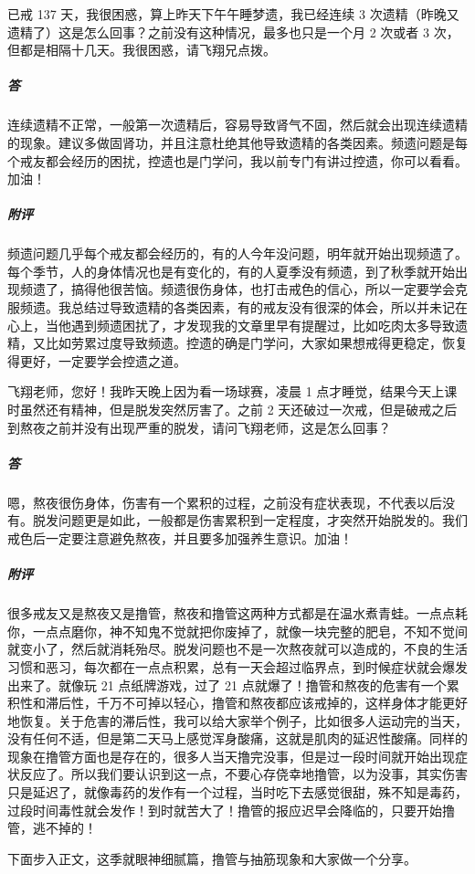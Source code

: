 \begin{case}
    已戒 137 天，我很困惑，算上昨天下午午睡梦遗，我已经连续 3 次遗精（昨晚又遗精了）这是怎么回事？之前没有这种情况，最多也只是一个月 2 次或者 3 次，但都是相隔十几天。我很困惑，请飞翔兄点拨。
    \subparagraph{答} 连续遗精不正常，一般第一次遗精后，容易导致肾气不固，然后就会出现连续遗精的现象。建议多做固肾功，并且注意杜绝其他导致遗精的各类因素。频遗问题是每个戒友都会经历的困扰，控遗也是门学问，我以前专门有讲过控遗，你可以看看。加油！
    \subparagraph{附评} 频遗问题几乎每个戒友都会经历的，有的人今年没问题，明年就开始出现频遗了。每个季节，人的身体情况也是有变化的，有的人夏季没有频遗，到了秋季就开始出现频遗了，搞得他很苦恼。频遗很伤身体，也打击戒色的信心，所以一定要学会克服频遗。我总结过导致遗精的各类因素，有的戒友没有很深的体会，所以并未记在心上，当他遇到频遗困扰了，才发现我的文章里早有提醒过，比如吃肉太多导致遗精，又比如劳累过度导致频遗。控遗的确是门学问，大家如果想戒得更稳定，恢复得更好，一定要学会控遗之道。
\end{case}

\begin{case}
    飞翔老师，您好！我昨天晚上因为看一场球赛，凌晨 1 点才睡觉，结果今天上课时虽然还有精神，但是脱发突然厉害了。之前 2 天还破过一次戒，但是破戒之后到熬夜之前并没有出现严重的脱发，请问飞翔老师，这是怎么回事？
    \subparagraph{答} 嗯，熬夜很伤身体，伤害有一个累积的过程，之前没有症状表现，不代表以后没有。脱发问题更是如此，一般都是伤害累积到一定程度，才突然开始脱发的。我们戒色后一定要注意避免熬夜，并且要多加强养生意识。加油！
    \subparagraph{附评} 很多戒友又是熬夜又是撸管，熬夜和撸管这两种方式都是在温水煮青蛙。一点点耗你，一点点磨你，神不知鬼不觉就把你废掉了，就像一块完整的肥皂，不知不觉间就变小了，然后就消耗殆尽。脱发问题也不是一次熬夜就可以造成的，不良的生活习惯和恶习，每次都在一点点积累，总有一天会超过临界点，到时候症状就会爆发出来了。就像玩 21 点纸牌游戏，过了 21 点就爆了！撸管和熬夜的危害有一个累积性和滞后性，千万不可掉以轻心，撸管和熬夜都应该戒掉的，这样身体才能更好地恢复。关于危害的滞后性，我可以给大家举个例子，比如很多人运动完的当天，没有任何不适，但是第二天马上感觉浑身酸痛，这就是肌肉的延迟性酸痛。同样的现象在撸管方面也是存在的，很多人当天撸完没事，但是过一段时间就开始出现症状反应了。所以我们要认识到这一点，不要心存侥幸地撸管，以为没事，其实伤害只是延迟了，就像毒药的发作有一个过程，当时吃下去感觉很甜，殊不知是毒药，过段时间毒性就会发作！到时就苦大了！撸管的报应迟早会降临的，只要开始撸管，逃不掉的！
\end{case}

下面步入正文，这季就眼神细腻篇，撸管与抽筋现象和大家做一个分享。

